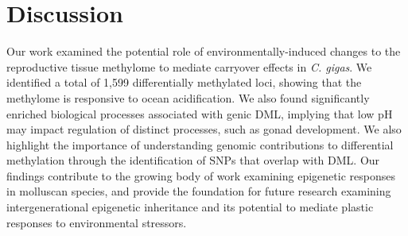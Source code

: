 \documentclass [11pt, proquest] {uwthesis}[2015/03/03]
\begin{document}
\hypertarget{discussion-2}{%
\section{Discussion}\label{discussion-2}}

Our work examined the potential role of environmentally-induced changes to the reproductive tissue methylome to mediate carryover effects in \emph{C. gigas}. We identified a total of 1,599 differentially methylated loci, showing that the methylome is responsive to ocean acidification. We also found significantly enriched biological processes associated with genic DML, implying that low pH may impact regulation of distinct processes, such as gonad development. We also highlight the importance of understanding genomic contributions to differential methylation through the identification of SNPs that overlap with DML. Our findings contribute to the growing body of work examining epigenetic responses in molluscan species, and provide the foundation for future research examining intergenerational epigenetic inheritance and its potential to mediate plastic responses to environmental stressors.
\end{document}
